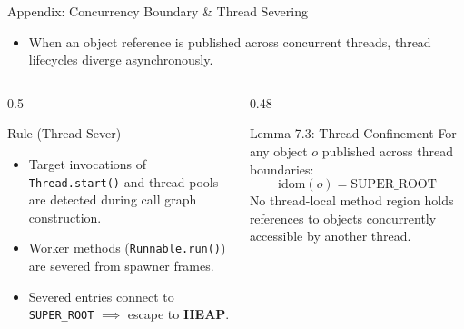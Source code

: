 \documentclass[11pt]{beamer}
\begin{document}
\begin{frame}{Appendix: Concurrency Boundary \& Thread Severing}
  \begin{itemize}
    \item When an object reference is published across concurrent threads, thread lifecycles diverge asynchronously.
  \end{itemize}

  \begin{columns}[T]
    \begin{column}{0.5\textwidth}
      \begin{block}{Rule (Thread-Sever)}
        \small
        \begin{itemize}
          \item Target invocations of \texttt{Thread.start()} and thread pools are detected during call graph construction.
          \item Worker methods (\texttt{Runnable.run()}) are severed from spawner frames.
          \item Severed entries connect to \texttt{SUPER\_ROOT} $\implies$ escape to \textbf{HEAP}.
        \end{itemize}
      \end{block}
    \end{column}
    \begin{column}{0.48\textwidth}
      \begin{alertblock}{Lemma 7.3: Thread Confinement}
        \small
        For any object $o$ published across thread boundaries:
        $$\text{idom}(o) = \text{SUPER\_ROOT}$$
        No thread-local method region holds references to objects concurrently accessible by another thread.
      \end{alertblock}
    \end{column}
  \end{columns}
\end{frame}
\end{document}
